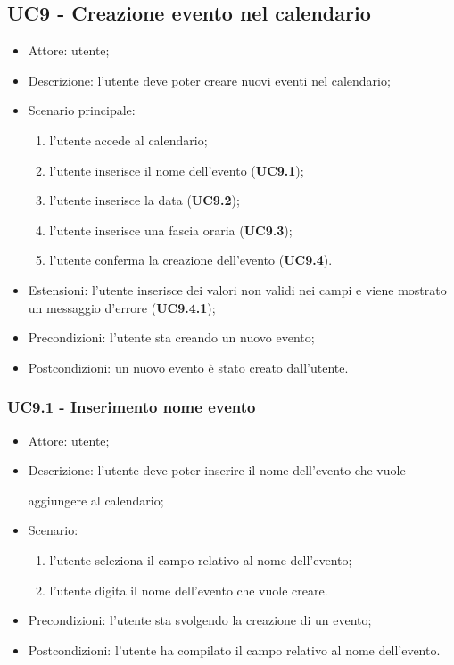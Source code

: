 \subsection{UC9 - Creazione evento nel calendario}
\begin{itemize}
    \item Attore: utente;
    \item Descrizione: l'utente deve poter creare nuovi eventi nel calendario;
    \item Scenario principale:
        \begin{enumerate}
        \item l'utente accede al calendario;
        \item l'utente inserisce il nome dell'evento (\textbf{UC9.1});
        \item l'utente inserisce la data (\textbf{UC9.2});
        \item l'utente inserisce una fascia oraria (\textbf{UC9.3});
        \item l'utente conferma la creazione dell'evento (\textbf{UC9.4}).
        \end{enumerate}
    \item Estensioni: l'utente inserisce dei valori non validi nei campi e viene mostrato un messaggio d'errore (\textbf{UC9.4.1});
    \item Precondizioni: l'utente sta creando un nuovo evento;
    \item Postcondizioni: un nuovo evento è stato creato dall'utente.
\end{itemize}

\subsubsection{UC9.1 - Inserimento nome evento}
\begin{itemize}
    \item Attore: utente;
    \item Descrizione: l'utente deve poter inserire il nome dell'evento che vuole \par aggiungere al calendario;
    \item Scenario:
        \begin{enumerate}
        \item l'utente seleziona il campo relativo al nome dell'evento;
        \item l'utente digita il nome dell'evento che vuole creare.
        \end{enumerate}
    
    \item Precondizioni: l'utente sta svolgendo la creazione di un evento;
    \item Postcondizioni: l'utente ha compilato il campo relativo al nome dell'evento.
\end{itemize}



